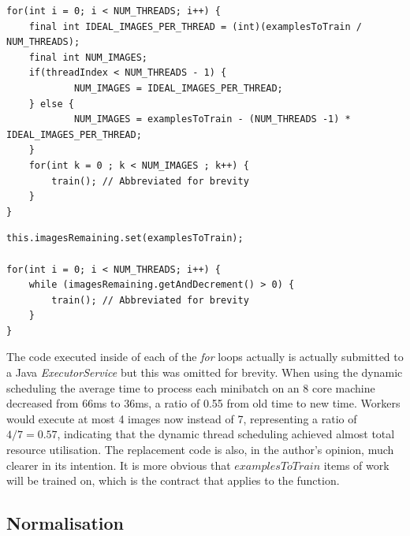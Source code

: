 \documentclass[12pt]{article}
\begin{document}
\begin{lstlisting}[caption={Old, static thread scheduling},label=staticThreads]
for(int i = 0; i < NUM_THREADS; i++) {
	final int IDEAL_IMAGES_PER_THREAD = (int)(examplesToTrain / NUM_THREADS);
	final int NUM_IMAGES;
	if(threadIndex < NUM_THREADS - 1) {    
    		NUM_IMAGES = IDEAL_IMAGES_PER_THREAD;
	} else {
    		NUM_IMAGES = examplesToTrain - (NUM_THREADS -1) * IDEAL_IMAGES_PER_THREAD;
	}
	for(int k = 0 ; k < NUM_IMAGES ; k++) {
		train(); // Abbreviated for brevity
	}
}
\end{lstlisting}

\begin{lstlisting}[caption={Dynamic thread scheduling replacement},label=dynamicThreads]
this.imagesRemaining.set(examplesToTrain);

for(int i = 0; i < NUM_THREADS; i++) {
    while (imagesRemaining.getAndDecrement() > 0) {
		train(); // Abbreviated for brevity
	}
}
\end{lstlisting}

The code executed inside of each of the \textit{for} loops actually is actually submitted to a Java \textit{ExecutorService} but this was omitted for brevity. When using the dynamic scheduling the average time to process each minibatch on an 8 core machine decreased from 66ms to 36ms, a ratio of 0.55 from old time to new time. Workers would execute at most 4 images now instead of 7, representing a ratio of $4/7 = 0.57$, indicating that the dynamic thread scheduling achieved almost total resource utilisation. The replacement code is also, in the author's opinion, much clearer in its intention. It is more obvious that $examplesToTrain$ items of work will be trained on, which is the contract that applies to the function.

\subsection{Normalisation}
\end{document}
